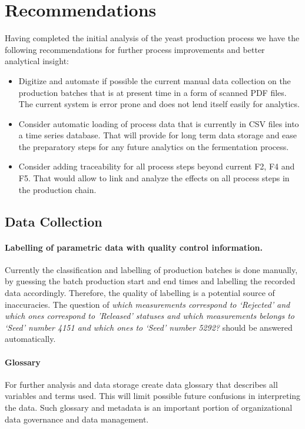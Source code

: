 \section{Recommendations}
\label{sec:recommendations}
Having completed the initial analysis of the yeast production process we have the following recommendations for further process improvements and better analytical insight:

\begin{itemize}
    \item Digitize and automate if possible the current manual data collection on the production batches that is at present time in a form of scanned PDF files. The current system is error prone and does not lend itself easily for analytics.
    \item Consider automatic loading of process data that is currently in CSV files into a time series database. That will provide for long term data storage and ease the preparatory steps for any future analytics on the fermentation process.
    \item Consider adding traceability for all process steps beyond current F2, F4 and F5. That would allow to link and analyze the effects on all process steps in the production chain.
\end{itemize}

\subsection{Data Collection}
\paragraph{Labelling of parametric data with quality control information.}
Currently the classification and labelling of production batches is done manually, by guessing the batch production start and end times and labelling the recorded data accordingly. Therefore, the quality of labelling is a potential source of inaccuracies. The question of \emph{which measurements correspond to ‘Rejected’ and which ones correspond to ’Released’ statuses and  which measurements belongs to ‘Seed’ number 4151 and which ones to ‘Seed’ number 5292?} should be answered automatically.

\paragraph{Glossary} For further analysis and data storage create data glossary that describes all variables and terms used. This will limit possible future confusions in interpreting the data. Such glossary and metadata is an important portion of organizational data governance and data management.

